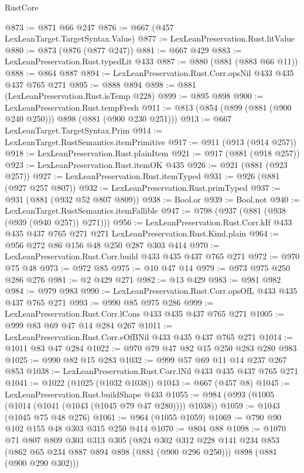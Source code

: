 \begin{lexlean}{RustCore}
\begin{coremodule}
@873 := @871 @66 @247
@876 := @667 (@457 LexLeanTarget.TargetSyntax.Value)
@877 := LexLeanPreservation.Rust.litValue
@880 := @873 (@876 (@877 @247))
@881 := @667 @429
@883 := LexLeanPreservation.Rust.typedLit @433
@887 := @880 (@881 (@883 @66 @11))
@888 := @864 @887
@894 := LexLeanPreservation.Rust.Corr.opsNil @433 @435 @437 @765 @271
@895 := @888 @894
@898 := @881 (LexLeanPreservation.Rust.isTemp @228)
@899 := @895 @898
@900 := LexLeanPreservation.Rust.tempFresh
@911 := @813 (@854 (@899 (@881 (@900 @240 @250))) @898 (@881 (@900 @230 @251)))
@913 := @667 LexLeanTarget.TargetSyntax.Prim
@914 := LexLeanTarget.RustSemantics.itemPrimitive
@917 := @911 (@913 (@914 @257))
@918 := LexLeanPreservation.Rust.plainItem
@921 := @917 (@881 (@918 @257))
@923 := LexLeanPreservation.Rust.itemOK @435
@926 := @921 (@881 (@923 @257))
@927 := LexLeanPreservation.Rust.itemTyped
@931 := @926 (@881 (@927 @257 @807))
@932 := LexLeanPreservation.Rust.primTyped
@937 := @931 (@881 (@932 @52 @807 @809))
@938 := Bool.or
@939 := Bool.not
@940 := LexLeanTarget.RustSemantics.itemFallible
@947 := @798 (@937 (@881 (@938 (@939 (@940 @257)) @271)))
@956 := LexLeanPreservation.Rust.Corr.kIf
    @433
    @435
    @437
    @765
    @271
    @271
    LexLeanPreservation.Rust.Kind.plain
@964 := @956 @272 @86 @156 @48 @250 @287 @303 @414
@970 := LexLeanPreservation.Rust.Corr.build @433 @435 @437 @765 @271
@972 := @970 @75 @48
@973 := @972 @85
@975 := @10 @47 @14
@979 := @973 @975 @250 @286 @276
@981 := @2 @429 @271
@982 := @13 @429
@983 := @981 @982
@984 := @979 @983
@990 := LexLeanPreservation.Rust.Corr.opsOfL @433 @435 @437 @765 @271
@993 := @990 @85 @975 @286
@999 := LexLeanPreservation.Rust.Corr.lCons @433 @435 @437 @765 @271
@1005 := @999 @83 @69 @47 @14 @284 @267
@1011 := LexLeanPreservation.Rust.Corr.eOfBNil @433 @435 @437 @765 @271
@1014 := @1011 @83 @47 @284
@1022 := @970 @79 @47 @82 @15 @250 @283 @280 @983
@1025 := @990 @82 @15 @283
@1032 := @999 @57 @69 @11 @14 @237 @267 @853
@1038 := LexLeanPreservation.Rust.Corr.lNil @433 @435 @437 @765 @271
@1041 := @1022 (@1025 (@1032 @1038))
@1043 := @667 (@457 @8)
@1045 := LexLeanPreservation.Rust.buildShape @433
@1055 := @984 (@993 (@1005 (@1014 (@1041 (@1043 (@1045 @79 @47 @280)))) @1038))
@1059 := @1043 (@1045 @75 @48 @276)
@1061 := @964 (@1055 @1059)
@1069 := @790 @90 @102 @155 @48 @303 @315 @250 @414
@1070 := @804 @88
@1098 := @1070
    @71
    @807
    @809
    @303
    @313
    @305
    (@824
      @302
      @312
      @228
      @141
      @234
      @853
      (@862 @65 @234 @887 @894 @898 (@881 (@900 @296 @250)))
      @898
      (@881 (@900 @290 @302)))

\end{coremodule}
\end{lexlean}
